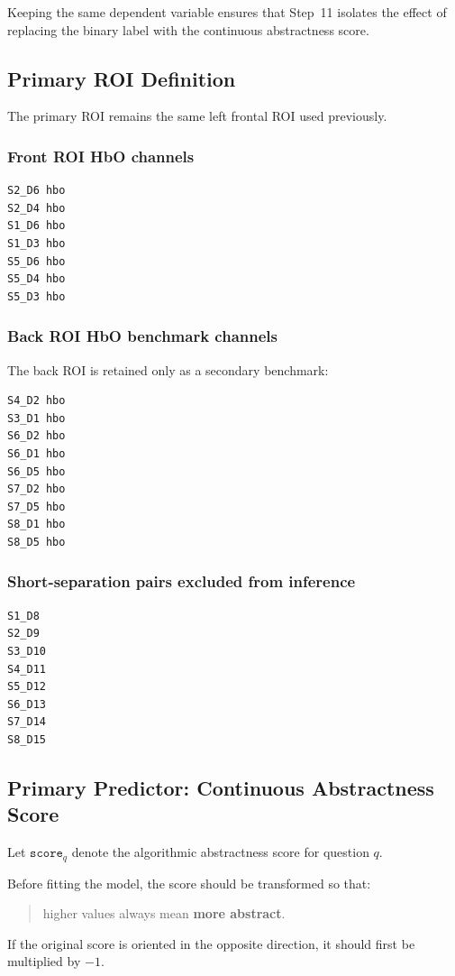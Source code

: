 Keeping the same dependent variable ensures that Step~11 isolates the effect of replacing the
binary label with the continuous abstractness score.

\subsection{Primary ROI Definition}
The primary ROI remains the same left frontal ROI used previously.

\subsubsection{Front ROI HbO channels}
\begin{verbatim}
S2_D6 hbo
S2_D4 hbo
S1_D6 hbo
S1_D3 hbo
S5_D6 hbo
S5_D4 hbo
S5_D3 hbo
\end{verbatim}

\subsubsection{Back ROI HbO benchmark channels}
The back ROI is retained only as a secondary benchmark:
\begin{verbatim}
S4_D2 hbo
S3_D1 hbo
S6_D2 hbo
S6_D1 hbo
S6_D5 hbo
S7_D2 hbo
S7_D5 hbo
S8_D1 hbo
S8_D5 hbo
\end{verbatim}

\subsubsection{Short-separation pairs excluded from inference}
\begin{verbatim}
S1_D8
S2_D9
S3_D10
S4_D11
S5_D12
S6_D13
S7_D14
S8_D15
\end{verbatim}

\subsection{Primary Predictor: Continuous Abstractness Score}
Let \(\texttt{score}_q\) denote the algorithmic abstractness score for question \(q\).

Before fitting the model, the score should be transformed so that:
\begin{quote}
higher values always mean \textbf{more abstract}.
\end{quote}

If the original score is oriented in the opposite direction, it should first be multiplied by \(-1\).

